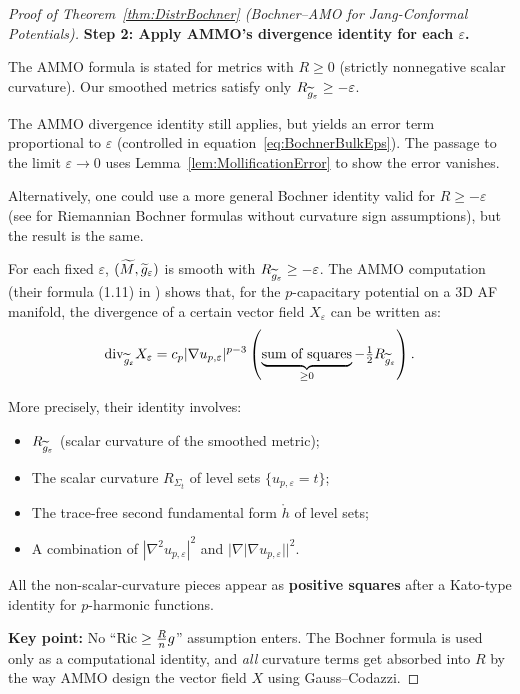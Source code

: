\begin{proof}[Proof of Theorem~\ref{thm:DistrBochner} (Bochner--AMO for Jang-Conformal Potentials)]
\textbf{Step 2: Apply AMMO's divergence identity for each $\varepsilon$.}

\begin{remark}
The AMMO formula \cite{amo2024} is stated for metrics with $R \ge 0$ (strictly nonnegative scalar curvature). Our smoothed metrics satisfy only $R_{\widetilde{g}_\varepsilon} \ge -\varepsilon$. 

The AMMO divergence identity still applies, but yields an error term proportional to $\varepsilon$ (controlled in equation~\eqref{eq:BochnerBulkEps}). The passage to the limit $\varepsilon \to 0$ uses Lemma~\ref{lem:MollificationError} to show the error vanishes.

Alternatively, one could use a more general Bochner identity valid for $R \ge -\varepsilon$ (see \cite{petersen2016} for Riemannian Bochner formulas without curvature sign assumptions), but the result is the same.
\end{remark}

For each fixed $\varepsilon$, $(\widetilde{M}, \widetilde{g}_\varepsilon)$ is smooth with $R_{\widetilde{g}_\varepsilon} \ge -\varepsilon$. The AMMO computation (their formula (1.11) in \cite{amo2024}) shows that, for the $p$-capacitary potential on a 3D AF manifold, the divergence of a certain vector field $X_\varepsilon$ can be written as:
\begin{equation}\label{eq:AMMODivergence}
    \mathrm{div}_{\widetilde{g}_\varepsilon} X_\varepsilon = c_p |\nabla u_{p,\varepsilon}|^{p-3} \left( \underbrace{\text{sum of squares}}_{\ge 0} - \tfrac{1}{2} R_{\widetilde{g}_\varepsilon} \right).
\end{equation}

More precisely, their identity involves:
\begin{itemize}
    \item $R_{\widetilde{g}_\varepsilon}$ (scalar curvature of the smoothed metric);
    \item The scalar curvature $R_{\Sigma_t}$ of level sets $\{u_{p,\varepsilon} = t\}$;
    \item The trace-free second fundamental form $\mathring{h}$ of level sets;
    \item A combination of $|\nabla^2 u_{p,\varepsilon}|^2$ and $|\nabla|\nabla u_{p,\varepsilon}||^2$.
\end{itemize}
All the non-scalar-curvature pieces appear as \textbf{positive squares} after a Kato-type identity for $p$-harmonic functions.

\textbf{Key point:} No ``$\mathrm{Ric} \ge \frac{R}{n}g$'' assumption enters. The Bochner formula is used only as a computational identity, and \emph{all} curvature terms get absorbed into $R$ by the way AMMO design the vector field $X$ using Gauss--Codazzi.


\end{proof}
